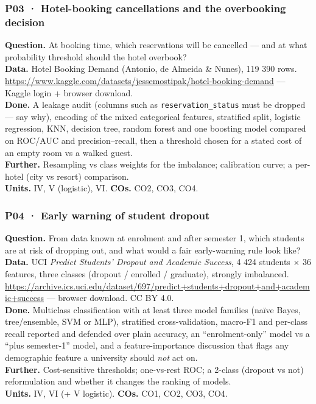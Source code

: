 \documentclass[11pt]{article}
\begin{document}
\hypertarget{p03-hotel-booking-cancellations-and-the-overbooking-decision}{%
\subsubsection{P03 · Hotel-booking cancellations and the overbooking decision}\label{p03-hotel-booking-cancellations-and-the-overbooking-decision}}

\textbf{Question.} At booking time, which reservations will be cancelled --- and at what probability threshold should the hotel overbook?\\
\textbf{Data.} Hotel Booking Demand (Antonio, de Almeida \& Nunes), 119 390 rows. \url{https://www.kaggle.com/datasets/jessemostipak/hotel-booking-demand} --- Kaggle login + browser download.\\
\textbf{Done.} A leakage audit (columns such as \texttt{reservation\_status} must be dropped --- say why), encoding of the mixed categorical features, stratified split, logistic regression, KNN, decision tree, random forest and one boosting model compared on ROC/AUC and precision--recall, then a threshold chosen for a stated cost of an empty room vs a walked guest.\\
\textbf{Further.} Resampling vs class weights for the imbalance; calibration curve; a per-hotel (city vs resort) comparison.\\
\textbf{Units.} IV, V (logistic), VI. \textbf{COs.} CO2, CO3, CO4.

\hypertarget{p04-early-warning-of-student-dropout}{%
\subsubsection{P04 · Early warning of student dropout}\label{p04-early-warning-of-student-dropout}}

\textbf{Question.} From data known at enrolment and after semester 1, which students are at risk of dropping out, and what would a fair early-warning rule look like?\\
\textbf{Data.} UCI \emph{Predict Students' Dropout and Academic Success}, 4 424 students × 36 features, three classes (dropout / enrolled / graduate), strongly imbalanced. \url{https://archive.ics.uci.edu/dataset/697/predict+students+dropout+and+academic+success} --- browser download. CC BY 4.0.\\
\textbf{Done.} Multiclass classification with at least three model families (naïve Bayes, tree/ensemble, SVM or MLP), stratified cross-validation, macro-F1 and per-class recall reported and defended over plain accuracy, an ``enrolment-only'' model vs a ``plus semester-1'' model, and a feature-importance discussion that flags any demographic feature a university should \emph{not} act on.\\
\textbf{Further.} Cost-sensitive thresholds; one-vs-rest ROC; a 2-class (dropout vs not) reformulation and whether it changes the ranking of models.\\
\textbf{Units.} IV, VI (+ V logistic). \textbf{COs.} CO1, CO2, CO3, CO4.
\end{document}
